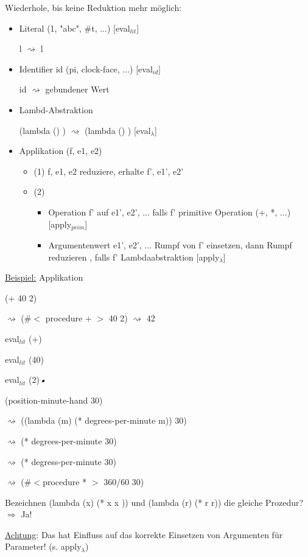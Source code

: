 \documentclass[a4paper, 20pt, openany]{book}
\begin{document}
Wiederhole, bis keine Reduktion mehr möglich:
\begin{itemize}
\item Literal (1, "abc", \#t, ...) [eval$_{lit}$]

l $\rightsquigarrow$ l
\item Identifier id (pi, clock-face, ...) [eval$_{id}$]

id $\rightsquigarrow$ gebundener Wert
\item Lambd-Abstraktion 

(lambda () ) $\rightsquigarrow$ (lambda () ) [eval$_{\lambda}$]

\item Applikation (f, e1, e2)
 \begin{itemize}
 \item (1) f, e1, e2 reduziere, erhalte f', e1', e2' 
 \item (2)
   \begin{itemize}
   \item Operation f' auf e1', e2', ... falls f' primitive Operation (+, *, ...) [apply$_{prim}$]
   \item Argumentenwert e1', e2', ... Rumpf von f' einsetzen, dann Rumpf reduzieren , falls f' Lambdaabstraktion [apply$_{\lambda}$]
   \end{itemize}
 \end{itemize}
\end{itemize}

\underline{Beispiel:} Applikation

(+ 40 2)

$\rightsquigarrow$ (\#$<$ procedure + $>$ 40 2) $\rightsquigarrow$ 42

eval$_{lit}$ (+)

eval$_{lit}$ (40)

eval$_{lit}$ (2)\textsl{•}


(position-minute-hand 30)

$\rightsquigarrow$ ((lambda (m) (* degrees-per-minute m)) 30)

$\rightsquigarrow$ (* degrees-per-minute 30)

$\rightsquigarrow$ (* degress-per-minute 30)

$\rightsquigarrow$ (\#$<$procedure * $>$ 360/60 30)

Bezeichnen (lambda (x) (* x x )) und (lambda (r) (* r r)) die gleiche Prozedur? $\Rightarrow$ Ja!

\underline{Achtung}: Das hat Einfluss auf das korrekte Einsetzen von Argumenten für Parameter! (s. apply$_{\lambda}$)
\end{document}
